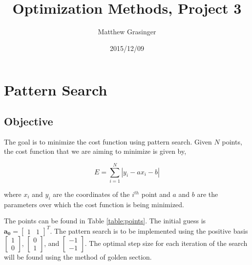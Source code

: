 \documentclass{article}
\title{Optimization Methods, Project 3}
\date{2015/12/09}
\author{Matthew Grasinger}
\begin{document}
	
	
\maketitle
\newpage
\tableofcontents
\newpage
{}

\section{Pattern Search}

\subsection{Objective}

The goal is to minimize the cost function using pattern search.
Given $N$ points, the cost function that we are aiming to minimize is given by,

\begin{equation}
E = \sum_{i = 1}^{N} |y_i - a x_i - b|
\end{equation}

\noindent where $x_i$ and $y_i$ are the coordinates of the $i^{th}$ point and $a$ and $b$ are the parameters over which the cost function is being minimized.

The points can be found in Table \ref{table:points}.
The initial guess is $\mathbf{a_0} = \begin{bmatrix} 1 & 1 \end{bmatrix}^T$.
The pattern search is to be implemented using the positive basis $\begin{bmatrix} 1 \\ 0 \end{bmatrix}$, $\begin{bmatrix} 0 \\ 1 \end{bmatrix}$, and $\begin{bmatrix} -1 \\ -1 \end{bmatrix}$.
The optimal step size for each iteration of the search will be found using the method of golden section.
\end{document}
